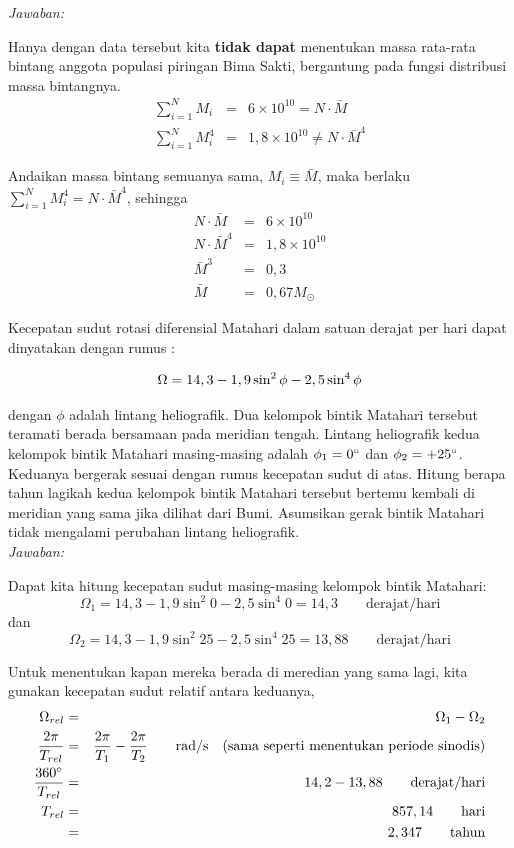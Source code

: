 \documentclass[11pt,fleqn]{exam}
\begin{document}
\begin{questions}
\textit{Jawaban: } 

Hanya dengan data tersebut kita \textbf{tidak dapat} menentukan massa rata-rata bintang anggota populasi piringan Bima Sakti, bergantung pada fungsi distribusi massa bintangnya.
\begin{eqnarray*}
\sum_{i=1}^{N} {M_i} &=& 6\times 10^{10} = N \cdot \bar{M} \\
\sum_{i=1}^{N} {M_i^4} &=& 1,8\times 10^{10} \neq N \cdot \bar{M}^4
\end{eqnarray*}

Andaikan massa bintang semuanya sama, $M_i \equiv \bar{M}$, maka berlaku $\sum_{i=1}^{N} {M_i^4} = N \cdot \bar{M}^4$, sehingga
\begin{eqnarray*}
N \cdot \bar{M} &=& 6\times 10^{10}\\
N \cdot \bar{M}^4 &=& 1,8\times 10^{10}\\
\bar{M}^3 &=& 0,3\\
\bar{M} &=& 0,67 M_{\odot}  
\end{eqnarray*}


\vspace{0.3cm}
\question Kecepatan sudut rotasi diferensial Matahari dalam satuan derajat per hari dapat dinyatakan dengan rumus :

\begin{eqnarray*}
\centering
\Omega = 14,3 - 1,9 \sin^2 \phi - 2,5 \sin^4 \phi
\end{eqnarray*}

dengan $\phi$ adalah lintang heliografik. Dua kelompok bintik Matahari tersebut teramati berada bersamaan pada meridian tengah. Lintang heliografik kedua kelompok bintik Matahari masing-masing adalah $\phi_1=0\degree$ dan $\phi_2=+25\degree$. Keduanya bergerak sesuai dengan rumus kecepatan sudut di atas. Hitung berapa tahun lagikah kedua kelompok bintik Matahari tersebut bertemu kembali di meridian yang sama jika dilihat dari Bumi. Asumsikan gerak bintik Matahari tidak mengalami perubahan lintang heliografik.\\

\textit{Jawaban: } 

Dapat kita hitung kecepatan sudut masing-masing kelompok bintik Matahari:
$$\Omega_1 = 14,3 - 1,9 \sin^2{0} - 2,5 \sin^4{0} = 14,3 \qquad \text{derajat/hari}$$
dan
$$\Omega_2 = 14,3 - 1,9 \sin^2{25} - 2,5 \sin^4{25} = 13,88 \qquad \text{derajat/hari}$$

Untuk menentukan kapan mereka berada di meredian yang sama lagi, kita gunakan kecepatan sudut relatif antara keduanya,
\begin{eqnarray*}
\Omega_{rel} &=& \Omega_1 - \Omega_2\\
\frac{2 \pi}{T_{rel}} &=& \frac{2 \pi}{T_{1}} - \frac{2 \pi}{T_{2}} \qquad \text{rad/s} \quad \text{(sama seperti menentukan periode sinodis)}\\
\frac{360\degree}{T_{rel}} &=& 14,2 - 13,88 \qquad \text{derajat/hari}\\
T_{rel} &=& 857,14 \qquad \text{hari}\\
&=& 2,347 \qquad \text{tahun}
\end{eqnarray*}


\end{questions}
\end{document}
